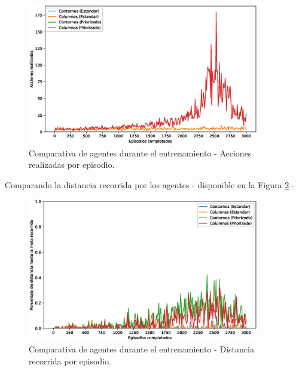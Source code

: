 \begin{figure}[h]
    \centering
    \includegraphics[width=0.9\textwidth]{imagenes/cap6/comparison/smoothed_actions.eps}
    \caption{Comparativa de agentes durante el entrenamiento - Acciones realizadas por episodio.}
    \label{fig:chap6-comparison-actions}
\end{figure}

Comparando la distancia recorrida por los agentes - disponible en la Figura \ref{fig:chap6-comparison-distances} - 

\begin{figure}[h]
    \centering
    \includegraphics[width=0.9\textwidth]{imagenes/cap6/comparison/smoothed_distances.eps}
    \caption{Comparativa de agentes durante el entrenamiento - Distancia recorrida por episodio.}
    \label{fig:chap6-comparison-distances}
\end{figure}

